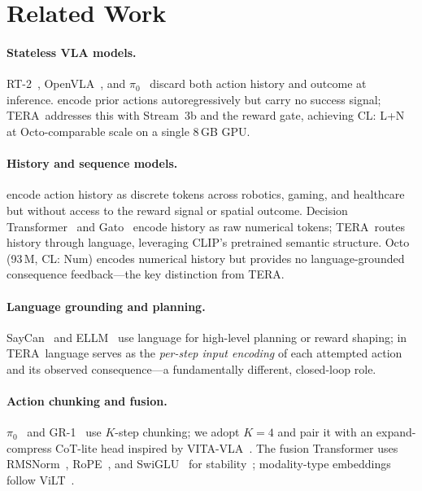 \documentclass{article}
\newcommand{\modelname}{\textsc{TERA}\xspace}
\begin{document}
\section{Related Work}
\label{sec:related}

\paragraph{Stateless VLA models.}
RT-2~\citep{brohan2023rt2}, OpenVLA~\citep{kim2024openvla}, and
$\pi_0$~\citep{black2024pi0} discard both action history and outcome at
inference.
\citet{hejna2025pi05} encode prior actions autoregressively but carry no success
signal; \modelname\ addresses this with Stream~3b and the reward gate,
achieving CL: L+N at Octo-comparable scale on a single 8\,GB GPU.

\paragraph{History and sequence models.}
\citet{durante2024agent} encode action history as discrete tokens across
robotics, gaming, and healthcare but without access to the reward signal or
spatial outcome.
Decision Transformer~\citep{chen2021decision} and Gato~\citep{reed2022gato}
encode history as raw numerical tokens; \modelname\ routes history through
language, leveraging CLIP's pretrained semantic structure.
Octo~\citep{octo2024} (93\,M, CL: Num) encodes numerical history but provides
no language-grounded consequence feedback---the key distinction from \modelname.

\paragraph{Language grounding and planning.}
SayCan~\citep{ahn2022saycan} and ELLM~\citep{du2023ellm} use language for
high-level planning or reward shaping; in \modelname\ language serves as the
\emph{per-step input encoding} of each attempted action and its observed
consequence---a fundamentally different, closed-loop role.

\paragraph{Action chunking and fusion.}
$\pi_0$~\citep{black2024pi0} and GR-1~\citep{wu2024gr1} use $K$-step chunking;
we adopt $K{=}4$ and pair it with an expand-compress CoT-lite head inspired by
VITA-VLA~\citep{vitavla2024}.
The fusion Transformer uses RMSNorm~\citep{zhang2019rmsnorm},
RoPE~\citep{su2021rope}, and SwiGLU~\citep{shazeer2020swiglu} for
stability~\citep{vaswani2017attention}; modality-type embeddings follow
ViLT~\citep{kim2021vilt}.
\end{document}
